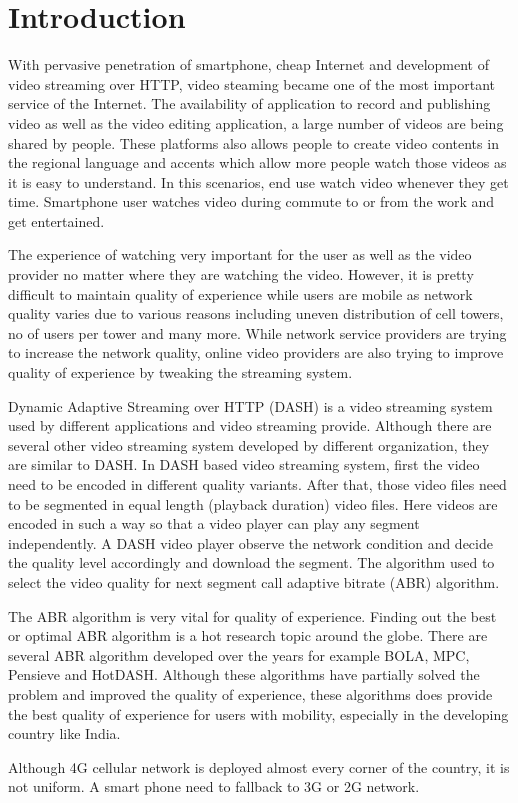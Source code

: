 \section{Introduction}
With pervasive penetration of smartphone, cheap Internet and development of video streaming over HTTP, video steaming became one of the most important service of the Internet. The availability of application to record and publishing video as well as the video editing application, a large number of videos are being shared by people. These platforms also allows people to create video contents in the regional language and accents which allow more people watch those videos as it is easy to understand. In this scenarios, end use watch video whenever they get time. Smartphone user watches video during commute to or from the work and get entertained.

The experience of watching very important for the user as well as the video provider no matter where they are watching the video. However, it is pretty difficult to maintain quality of experience while users are mobile as network quality varies due to various reasons including uneven distribution of cell towers, no of users per tower and many more. While network service providers are trying to increase the network quality, online video providers are also trying to improve quality of experience by tweaking the streaming system.

Dynamic Adaptive Streaming over HTTP (DASH) is a video streaming system used by different applications and video streaming provide. Although there are several other video streaming system developed by different organization, they are similar to DASH. In DASH based video streaming system, first the video need to be encoded in different quality variants. After that, those video files need to be segmented in equal length (playback duration) video files. Here videos are encoded in such a way so that a video player can play any segment independently. A DASH video player observe the network condition and decide the quality level accordingly and download the segment. The algorithm used to select the video quality for next segment call adaptive bitrate (ABR) algorithm.

The ABR algorithm is very vital for quality of experience. Finding out the best or optimal ABR algorithm is a hot research topic around the globe. There are several ABR algorithm developed over the years for example BOLA, MPC, Pensieve and HotDASH. Although these algorithms have partially solved the problem and improved the quality of experience, these algorithms does provide the best quality of experience for users with mobility, especially in the developing country like India.

Although 4G cellular network is deployed almost every corner of the country, it is not uniform. A smart phone need to fallback to 3G or 2G network. 

